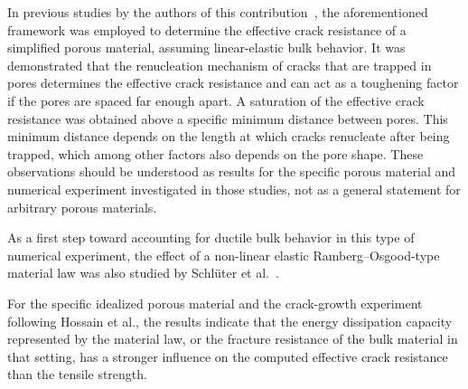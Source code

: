 \documentclass[pdflatex,sn-mathphys-num]{sn-jnl}%
\theoremstyle{thmstyleone}%
\theoremstyle{thmstyletwo}%
\theoremstyle{thmstylethree}%
\begin{document}

In previous studies by the authors of this contribution~\cite{schlueter_ermittlung_2025,schluter_determination_2025},
the aforementioned framework was employed to determine the effective crack resistance of a simplified porous material,
assuming linear-elastic bulk behavior. It was demonstrated that
the renucleation mechanism of cracks that are trapped in pores
determines the effective crack resistance
and can act as a toughening factor if the pores are
spaced far enough apart. A saturation of the effective crack resistance was obtained above
a specific minimum distance between pores. This minimum distance depends on the
length at which cracks renucleate after being trapped, which among other factors also
depends on the pore shape.
These observations should be understood as results for the specific porous material and numerical experiment investigated in those studies, not as a general statement for arbitrary porous materials.

As a first step toward accounting for ductile bulk behavior in this type of numerical experiment,
the effect of a non-linear elastic Ramberg--Osgood-type material law was also studied by Schlüter et al.~\cite{schluter_influence_2025}.

For the specific idealized porous material and the crack-growth experiment following Hossain et al.,
the results indicate that the energy dissipation capacity represented by the material law,
or the fracture resistance of the bulk material in that setting,
has a stronger influence on the computed effective crack resistance than the tensile strength.
\end{document}
